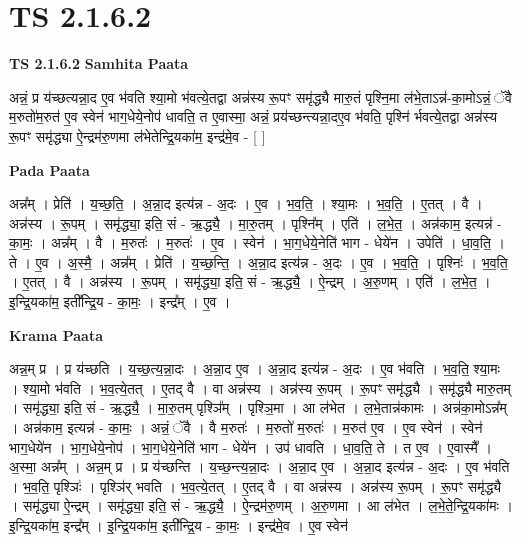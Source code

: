 \documentclass[17pt]{extarticle}
\begin{document}
\section*{ TS 2.1.6.2 }

\textbf{TS 2.1.6.2 } \newline
\textbf{Samhita Paata} \newline

अन्नं॒ प्र य॑च्छत्यन्ना॒द ए॒व भ॑वति श्या॒मो भ॑वत्ये॒तद्वा अन्न॑स्य रू॒पꣳ समृ॑द्ध्यै मारु॒तं पृश्नि॒मा ल॑भे॒ताऽन्न॑-का॒मोऽन्नं॒ ॅवै म॒रुतो॑म॒रुत॑ ए॒व स्वेन॑ भाग॒धेये॒नोप॑ धावति॒ त ए॒वास्मा॒ अन्नं॒ प्रय॑च्छन्त्यन्ना॒द‌ए॒व भ॑वति॒ पृश्नि॑ र्भवत्ये॒तद्वा अन्न॑स्य रू॒पꣳ समृ॑द्ध्या ऐ॒न्द्रम॑रु॒णमा ल॑भेतेन्द्रि॒यका॑म॒ इन्द्र॑मे॒व - [  ] \newline

\textbf{Pada Paata} \newline

अन्न᳚म् । प्रेति॑ । य॒च्छ॒ति॒ । अ॒न्ना॒द इत्य॑न्न - अ॒दः । ए॒व । भ॒व॒ति॒ । श्या॒मः । भ॒व॒ति॒ । ए॒तत् । वै । अन्न॑स्य । रू॒पम् । समृ॑द्ध्या॒ इति॒ सं - ऋ॒द्ध्यै॒ । मा॒रु॒तम् । पृश्नि᳚म् । एति॑ । ल॒भे॒त॒ । अन्न॑काम॒ इत्यन्न॑ - का॒मः॒ । अन्न᳚म् । वै । म॒रुतः॑ । म॒रुतः॑ । ए॒व । स्वेन॑ । भा॒ग॒धेये॒नेति॑ भाग - धेये॑न । उपेति॑ । धा॒व॒ति॒ । ते । ए॒व । अ॒स्मै॒ । अन्न᳚म् । प्रेति॑ । य॒च्छ॒न्ति॒ । अ॒न्ना॒द इत्य॑न्न - अ॒दः । ए॒व । भ॒व॒ति॒ । पृश्निः॑ । भ॒व॒ति॒ । ए॒तत् । वै । अन्न॑स्य । रू॒पम् । समृ॑द्ध्या॒ इति॒ सं - ऋ॒द्ध्यै॒ । ऐ॒न्द्रम् । अ॒रु॒णम् । एति॑ । ल॒भे॒त॒ । इ॒न्द्रि॒यका॑म॒ इती᳚न्द्रि॒य - का॒मः॒ । इन्द्र᳚म् । ए॒व ।  \newline


\textbf{Krama Paata} \newline

अन्न॒म् प्र । प्र य॑च्छति । य॒च्छ॒त्य॒न्ना॒दः । अ॒न्ना॒द ए॒व । अ॒न्ना॒द इत्य॑न्न - अ॒दः । ए॒व भ॑वति । भ॒व॒ति॒ श्या॒मः । श्या॒मो भ॑वति । भ॒व॒त्ये॒तत् । ए॒तद् वै । वा अन्न॑स्य । अन्न॑स्य रू॒पम् । रू॒पꣳ समृ॑द्ध्यै । समृ॑द्ध्यै मारु॒तम् । समृ॑द्ध्या॒ इति॒ सं - ऋ॒द्ध्यै॒ । मा॒रु॒तम् पृश्ञि᳚म् । पृश्ञि॒मा । आ ल॑भेत । ल॒भे॒तान्न॑कामः । अन्न॑का॒मोऽन्न᳚म् । अन्न॑काम॒ इत्यन्न॑ - का॒मः॒ । अन्नं॒ ॅवै । वै म॒रुतः॑ । म॒रुतो॑ म॒रुतः॑ । म॒रुत॑ ए॒व । ए॒व स्वेन॑ । स्वेन॑ भाग॒धेये॑न । भा॒ग॒धेये॒नोप॑ । भा॒ग॒धेये॒नेति॑ भाग - धेये॑न । उप॑ धावति । धा॒व॒ति॒ ते । त ए॒व । ए॒वास्मै᳚ । अ॒स्मा॒ अन्न᳚म् । अन्न॒म् प्र । प्र य॑च्छन्ति । य॒च्छ॒न्त्य॒न्ना॒दः । अ॒न्ना॒द ए॒व । अ॒न्ना॒द इत्य॑न्न - अ॒दः । ए॒व भ॑वति । भ॒व॒ति॒ पृश्ञिः॑ । पृश्ञि॑र् भवति । भ॒व॒त्ये॒तत् । ए॒तद् वै । वा अन्न॑स्य । अन्न॑स्य रू॒पम् । रू॒पꣳ समृ॑द्ध्यै । समृ॑द्ध्या ऐ॒न्द्रम् । समृ॑द्ध्या॒ इति॒ सं - ऋ॒द्ध्यै॒ । ऐ॒न्द्रम॑रु॒णम् । अ॒रु॒णमा । आ ल॑भेत । ल॒भे॒ते॒न्द्रि॒यका॑मः । इ॒न्द्रि॒यका॑म॒ इन्द्र᳚म् । इ॒न्द्रि॒यका॑म॒ इती᳚न्द्रि॒य - का॒मः॒ । इन्द्र॑मे॒व । ए॒व स्वेन॑ \newline
\end{document}
